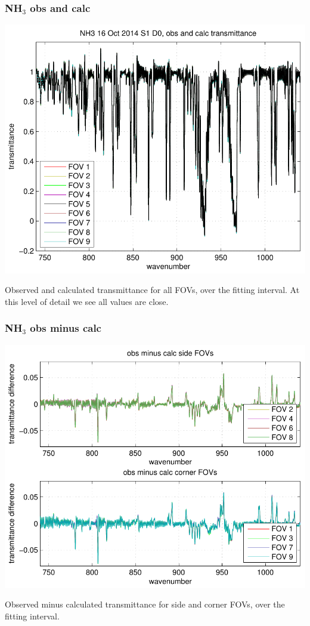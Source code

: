 \documentclass[11pt]{beamer}
\begin{document}
\begin{frame}
\frametitle{NH$_3$ obs and calc}

\begin{center}
  \includegraphics[scale=0.54]{figures/NH3_obs_and_calc.pdf}
\end{center}

Observed and calculated transmittance for all FOVs, over the fitting
interval.  At this level of detail we see all values are close.

\end{frame}
\begin{frame}
\frametitle{NH$_3$ obs minus calc}

\begin{center}
  \includegraphics[scale=0.54]{figures/NH3_breakout_2.pdf}
\end{center}

Observed minus calculated transmittance for side and corner FOVs,
over the fitting interval.

\end{frame}
\end{document}
